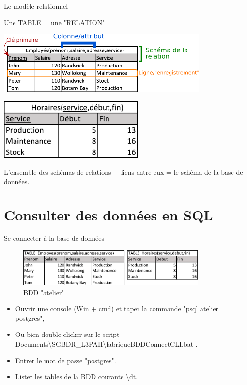 \documentclass[xetex,dvipsnames]{beamer}
\begin{document}
\begin{frame}[t]{Le modèle relationnel}
		\begin{center}
			Une TABLE = une "RELATION"
	    \end{center}
			\vspace{0.3em}
	    	\includegraphics[width=0.8\textwidth]{./figures/relation.pdf}
	    	\vspace{0.3em}
	    	\vspace*{0.3em}
\begin{flushright}
	    	\includegraphics[width=0.55\textwidth]{./figures/relation2.pdf}
\end{flushright}
 			\begin{center}
			L'ensemble des schémas de relations + liens entre eux = le schéma de la base de données.
	    \end{center}
\end{frame}


\section{Consulter des données en SQL}
\begin{frame}{Se connecter à la base de données}
 	\begin{center}
	    	\begin{figure}
	    	\includegraphics[width=0.85\textwidth]{./figures/BDDatelier.pdf}
	    	\caption{BDD "atelier"}
	    	\end{figure}
	\end{center}
	\begin{itemize}
		\item Ouvrir une console (Win + cmd) et taper la commande "psql atelier postgres",
		\item Ou bien double clicker sur le script Documents\textbackslash SGBDR\_L3PAII\textbackslash fabriqueBDDConnectCLI.bat .
		\item Entrer le mot de passe "postgres".
		\item Lister les tables de la BDD courante \textbackslash dt.
	\end{itemize}		
\end{frame}
\end{document}
